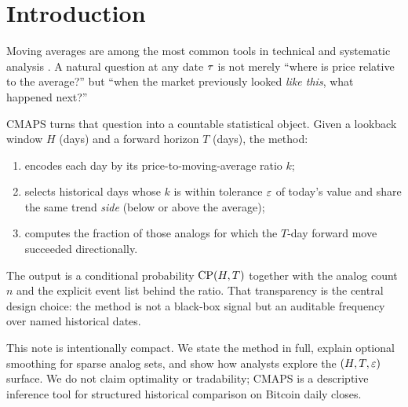 \section{Introduction}
\label{sec:intro}

Moving averages are among the most common tools in technical and systematic analysis \cite{lo2000technical}.
A natural question at any date $\tau$ is not merely ``where is price relative to the average?'' but ``when the market previously looked \emph{like this}, what happened next?''

CMAPS turns that question into a countable statistical object.
Given a lookback window $H$ (days) and a forward horizon $T$ (days), the method:
\begin{enumerate}
  \item encodes each day by its price-to-moving-average ratio $k$;
  \item selects historical days whose $k$ is within tolerance $\varepsilon$ of today's value and share the same trend \emph{side} (below or above the average);
  \item computes the fraction of those analogs for which the $T$-day forward move succeeded directionally.
\end{enumerate}

The output is a conditional probability $\mathrm{CP}(H,T)$ together with the analog count $n$ and the explicit event list behind the ratio.
That transparency is the central design choice: the method is not a black-box signal but an auditable frequency over named historical dates.

This note is intentionally compact.
We state the method in full, explain optional smoothing for sparse analog sets, and show how analysts explore the $(H,T,\varepsilon)$ surface.
We do not claim optimality or tradability; CMAPS is a descriptive inference tool for structured historical comparison on Bitcoin daily closes.
